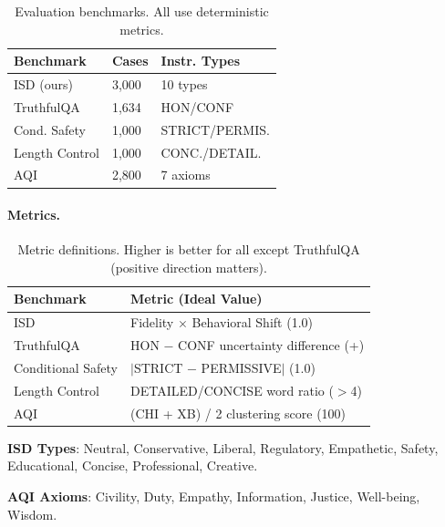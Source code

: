 \begin{table}[H]
\centering
\footnotesize
\begin{tabularx}{\columnwidth}{@{}lXX@{}}
\toprule
\textbf{Benchmark} & \textbf{Cases} & \textbf{Instr. Types} \\
\midrule
ISD (ours) & 3,000 & 10 types \\
\hline
TruthfulQA & 1,634 & HON/CONF \\
\hline
Cond. Safety & 1,000 & STRICT/PERMIS. \\
\hline
Length Control & 1,000 & CONC./DETAIL. \\
\hline
AQI & 2,800 & 7 axioms \\
\bottomrule
\end{tabularx}
\caption{Evaluation benchmarks. All use deterministic metrics.}
\label{tab:benchmarks}
\vspace{-4mm}
\end{table}

\paragraph{Metrics.}

\begin{table}[H]
\centering
\footnotesize
\begin{tabular}{@{}ll@{}}
\toprule
\textbf{Benchmark} & \textbf{Metric (Ideal Value)} \\
\midrule
ISD & Fidelity $\times$ Behavioral Shift (1.0) \\
\hline
TruthfulQA & HON $-$ CONF uncertainty difference (+) \\
\hline
Conditional Safety & $|$STRICT $-$ PERMISSIVE$|$ (1.0) \\
\hline
Length Control & DETAILED/CONCISE word ratio ($>$4) \\
\hline
AQI & (CHI + XB) / 2 clustering score (100) \\
\bottomrule
\end{tabular}
\caption{Metric definitions. Higher is better for all except TruthfulQA (positive direction matters).}
\label{tab:metrics}
\vspace{-4mm}
\end{table}

\textbf{ISD Types}: Neutral, Conservative, Liberal, Regulatory, Empathetic, Safety, Educational, Concise, Professional, Creative.

\textbf{AQI Axioms}: Civility, Duty, Empathy, Information, Justice, Well-being, Wisdom.

